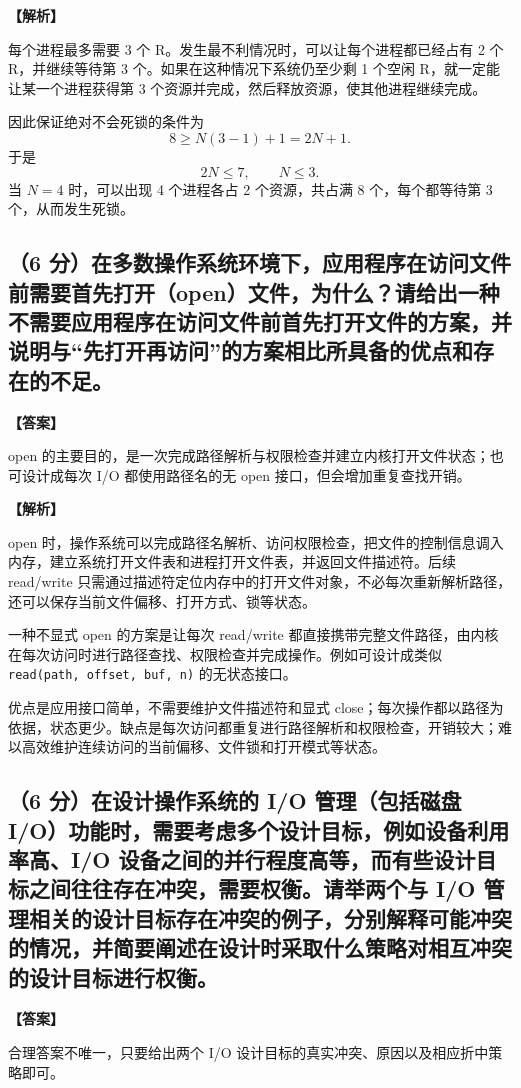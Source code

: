 \documentclass[UTF8,12pt]{ctexart}
\newenvironment{explanation}{\par\noindent\textbf{【解析】}\par\smallskip}{\par\medskip}
\newenvironment{answer}{\par\noindent\textbf{【答案】}\par\smallskip}{\par}
\begin{document}
\begin{explanation}
每个进程最多需要 3 个 R。发生最不利情况时，可以让每个进程都已经占有 2 个 R，并继续等待第 3 个。如果在这种情况下系统仍至少剩 1 个空闲 R，就一定能让某一个进程获得第 3 个资源并完成，然后释放资源，使其他进程继续完成。

因此保证绝对不会死锁的条件为
\[
8\ge N(3-1)+1=2N+1.
\]
于是
\[
2N\le7,\qquad N\le3.
\]
当 $N=4$ 时，可以出现 4 个进程各占 2 个资源，共占满 8 个，每个都等待第 3 个，从而发生死锁。
\end{explanation}
\subsection*{（6 分）在多数操作系统环境下，应用程序在访问文件前需要首先打开（open）文件，为什么？请给出一种不需要应用程序在访问文件前首先打开文件的方案，并说明与“先打开再访问”的方案相比所具备的优点和存在的不足。}
\begin{answer}
open 的主要目的，是一次完成路径解析与权限检查并建立内核打开文件状态；也可设计成每次 I/O 都使用路径名的无 open 接口，但会增加重复查找开销。
\end{answer}

\begin{explanation}
open 时，操作系统可以完成路径名解析、访问权限检查，把文件的控制信息调入内存，建立系统打开文件表和进程打开文件表，并返回文件描述符。后续 read/write 只需通过描述符定位内存中的打开文件对象，不必每次重新解析路径，还可以保存当前文件偏移、打开方式、锁等状态。

一种不显式 open 的方案是让每次 read/write 都直接携带完整文件路径，由内核在每次访问时进行路径查找、权限检查并完成操作。例如可设计成类似
\texttt{read(path, offset, buf, n)} 的无状态接口。

优点是应用接口简单，不需要维护文件描述符和显式 close；每次操作都以路径为依据，状态更少。缺点是每次访问都重复进行路径解析和权限检查，开销较大；难以高效维护连续访问的当前偏移、文件锁和打开模式等状态。
\end{explanation}
\subsection*{（6 分）在设计操作系统的 I/O 管理（包括磁盘 I/O）功能时，需要考虑多个设计目标，例如设备利用率高、I/O 设备之间的并行程度高等，而有些设计目标之间往往存在冲突，需要权衡。请举两个与 I/O 管理相关的设计目标存在冲突的例子，分别解释可能冲突的情况，并简要阐述在设计时采取什么策略对相互冲突的设计目标进行权衡。}
\begin{answer}
合理答案不唯一，只要给出两个 I/O 设计目标的真实冲突、原因以及相应折中策略即可。
\end{answer}
\end{document}
